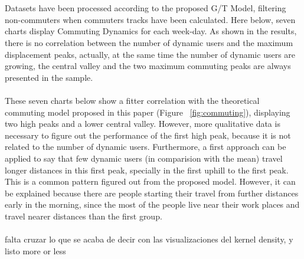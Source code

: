 \\
\\
Datasets have been processed according to the proposed G/T Model, filtering non-commuters when commuters tracks have been calculated. Here below, seven charts display Commuting Dynamics for each week-day.
As shown in the results, there is no correlation between the number of dynamic users and the maximum displacement peaks, actually, at the same time the number of dynamic users are growing, the central valley and the two maximum commuting peaks are always presented in the sample.
\\
\\
These seven charts below show a fitter correlation with the theoretical commuting model proposed in this paper (Figure ~\ref{fig:commuting}), displaying two high peaks and a lower central valley. However, more qualitative data is necessary to figure out the performance of the first high peak, because it is not related to the number of dynamic users. Furthermore, a first approach can be applied to say that few dynamic users (in comparision with the mean) travel longer distances in this first peak, specially in  the first uphill to the first peak. This is a common pattern figured out from the proposed model. However, it can be explained because there are people starting their travel from further distances early in the morning, since the most of the people live near their work places and travel nearer distances than the first group.  
\\
\\
 {\color{red} falta cruzar lo que se acaba de decir con las visualizaciones del kernel density, y listo more or less}


